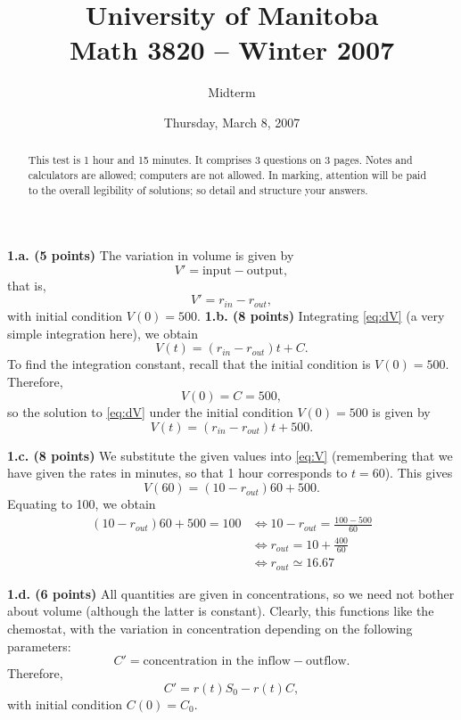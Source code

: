 \documentclass[12pt]{article}
\title{University of Manitoba\\ Math 3820 -- Winter 2007}
\author{Midterm}
\date{Thursday, March 8, 2007}
\theoremstyle{plain}
\begin{document}
\maketitle
\thispagestyle{empty}
\begin{abstract}
This test is 1 hour and 15 minutes. It comprises 3 questions on 3 pages. Notes and calculators are allowed; computers are not allowed.
In marking, attention will be paid to the overall legibility of solutions; so detail and structure your answers.
\end{abstract}



\noindent
{\bf 1.a. (5 points)}
The variation in volume is given by
\[
V'=\textrm{input}-\textrm{output},
\]
that is,
\begin{equation}\label{eq:dV}
V'=r_{in}-r_{out},
\end{equation}
with initial condition $V(0)=500$.
\vskip0.5cm
\noindent
{\bf 1.b. (8 points)} 
Integrating \eqref{eq:dV} (a very simple integration here), we obtain
\[
V(t)=(r_{in}-r_{out})t+C.
\]
To find the integration constant, recall that the initial condition is $V(0)=500$. Therefore,
\[
V(0)=C=500,
\]
so the solution to \eqref{eq:dV} under the initial condition $V(0)=500$ is given by
\begin{equation}\label{eq:V}
V(t)=(r_{in}-r_{out})t+500.
\end{equation}

\vskip0.5cm
\noindent
{\bf 1.c. (8 points)}
We substitute the given values into \eqref{eq:V} (remembering that we have given the rates in minutes, so that 1 hour corresponds to $t=60$). This gives
\[
V(60)=(10-r_{out})60+500.
\]
Equating to 100, we obtain
\begin{align*}
(10-r_{out})60+500=100 &\Leftrightarrow 10-r_{out}=\frac{100-500}{60} \\
&\Leftrightarrow r_{out}=10+\frac{400}{60} \\
&\Leftrightarrow r_{out}\simeq 16.67
\end{align*}

\vskip0.5cm
\noindent
{\bf 1.d. (6 points)} 
All quantities are given in concentrations, so we need not bother about volume (although the latter is constant). Clearly, this functions like the chemostat, with the variation in concentration depending on the following parameters:
\[
C'=\textrm{concentration in the inflow}-\textrm{outflow}.
\]
Therefore,
\begin{equation}\label{eq:dC}
C'=r(t)S_0-r(t)C,
\end{equation}
with initial condition $C(0)=C_0$.
\end{document}
